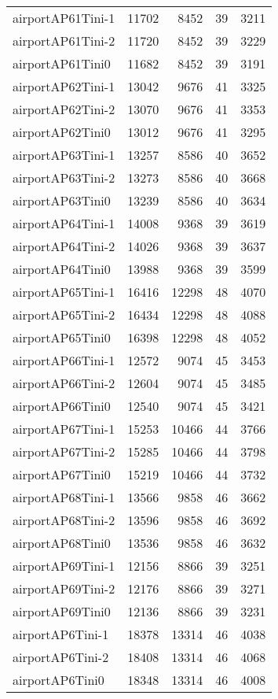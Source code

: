 \begin{tabular}{lrrrr}
airportAP61Tini-1 & 11702 & 8452 & 39 & 3211 \\
airportAP61Tini-2 & 11720 & 8452 & 39 & 3229 \\
airportAP61Tini0 & 11682 & 8452 & 39 & 3191 \\
airportAP62Tini-1 & 13042 & 9676 & 41 & 3325 \\
airportAP62Tini-2 & 13070 & 9676 & 41 & 3353 \\
airportAP62Tini0 & 13012 & 9676 & 41 & 3295 \\
airportAP63Tini-1 & 13257 & 8586 & 40 & 3652 \\
airportAP63Tini-2 & 13273 & 8586 & 40 & 3668 \\
airportAP63Tini0 & 13239 & 8586 & 40 & 3634 \\
airportAP64Tini-1 & 14008 & 9368 & 39 & 3619 \\
airportAP64Tini-2 & 14026 & 9368 & 39 & 3637 \\
airportAP64Tini0 & 13988 & 9368 & 39 & 3599 \\
airportAP65Tini-1 & 16416 & 12298 & 48 & 4070 \\
airportAP65Tini-2 & 16434 & 12298 & 48 & 4088 \\
airportAP65Tini0 & 16398 & 12298 & 48 & 4052 \\
airportAP66Tini-1 & 12572 & 9074 & 45 & 3453 \\
airportAP66Tini-2 & 12604 & 9074 & 45 & 3485 \\
airportAP66Tini0 & 12540 & 9074 & 45 & 3421 \\
airportAP67Tini-1 & 15253 & 10466 & 44 & 3766 \\
airportAP67Tini-2 & 15285 & 10466 & 44 & 3798 \\
airportAP67Tini0 & 15219 & 10466 & 44 & 3732 \\
airportAP68Tini-1 & 13566 & 9858 & 46 & 3662 \\
airportAP68Tini-2 & 13596 & 9858 & 46 & 3692 \\
airportAP68Tini0 & 13536 & 9858 & 46 & 3632 \\
airportAP69Tini-1 & 12156 & 8866 & 39 & 3251 \\
airportAP69Tini-2 & 12176 & 8866 & 39 & 3271 \\
airportAP69Tini0 & 12136 & 8866 & 39 & 3231 \\
airportAP6Tini-1 & 18378 & 13314 & 46 & 4038 \\
airportAP6Tini-2 & 18408 & 13314 & 46 & 4068 \\
airportAP6Tini0 & 18348 & 13314 & 46 & 4008 \\

\end{tabular}
